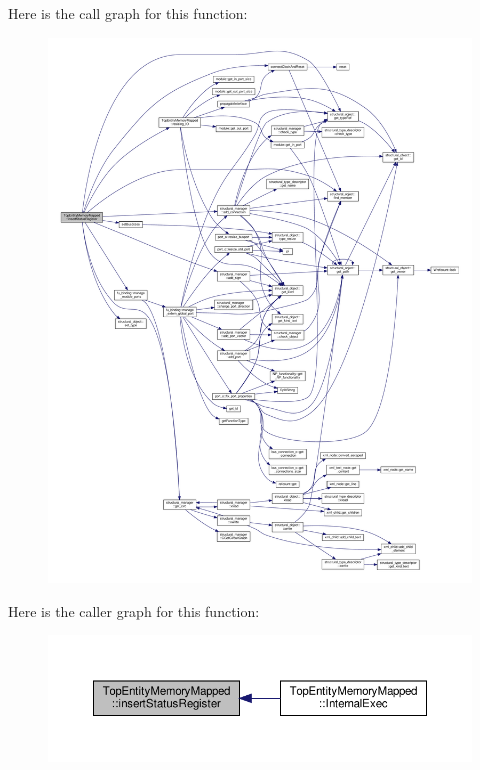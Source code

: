 Here is the call graph for this function\+:
\nopagebreak
\begin{figure}[H]
\begin{center}
\leavevmode
\includegraphics[width=350pt]{d1/db6/classTopEntityMemoryMapped_a78518a7d319f9fdc467a8fc74416268f_cgraph}
\end{center}
\end{figure}
Here is the caller graph for this function\+:
\nopagebreak
\begin{figure}[H]
\begin{center}
\leavevmode
\includegraphics[width=350pt]{d1/db6/classTopEntityMemoryMapped_a78518a7d319f9fdc467a8fc74416268f_icgraph}
\end{center}
\end{figure}
\mbox{\label{classTopEntityMemoryMapped_a33c5cbfe6f3cbd462a0f48e0a000674f}} 
